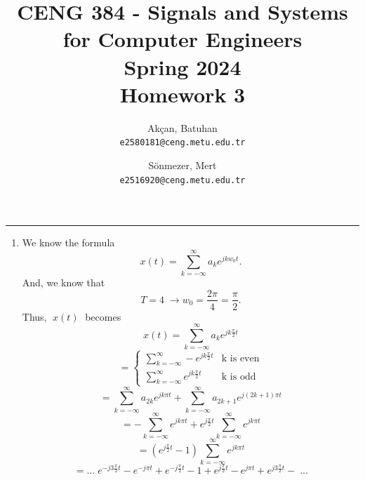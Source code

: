\documentclass[10pt,a4paper, margin=1in]{article}
\author{
  Akçan, Batuhan\\
  \texttt{e2580181@ceng.metu.edu.tr}
  \and
  Sönmezer, Mert\\
  \texttt{e2516920@ceng.metu.edu.tr}
}
\title{CENG 384 - Signals and Systems for Computer Engineers \\
Spring 2024 \\
Homework 3}
\begin{document}
\maketitle



\noindent\rule{19cm}{1.2pt}

\begin{enumerate}

\item %
We know the formula
$$x(t) = \sum_{k=-\infty}^{\infty} a_k e^{jkw_0t}.$$
And, we know that
$$T=4 \; \rightarrow w_0 = \frac{2\pi}{4} = \frac{\pi}{2}.$$
Thus, $\; x(t) \;$ becomes
$$x(t) = \sum_{k=-\infty}^{\infty} a_k e^{jk\frac{\pi}{2}t}$$
$$=
\begin{cases}
    \sum_{k=-\infty}^{\infty}-e^{jk\frac{\pi}{2}t} & \text{k is even}\\
    \sum_{k=-\infty}^{\infty}e^{jk\frac{\pi}{2}t} & \text{k is odd}
\end{cases}
$$
$$=\sum_{k=-\infty}^{\infty}a_{2k}e^{jk\pi t}+\sum_{k=-\infty}^{\infty}a_{2k+1}e^{j(2k+1)\pi t}$$
$$=-\sum_{k=-\infty}^{\infty}e^{jk\pi t}+e^{j\frac{\pi}{2} t}\sum_{k=-\infty}^{\infty}e^{jk\pi t}$$
$$=(e^{j\frac{\pi}{2}t} - 1)\sum_{k=-\infty}^{\infty}e^{jk\pi t}$$
$$= ... \; e^{-j3\frac{\pi}{2} t} - e^{-j\pi t}+e^{-j\frac{\pi}{2}t}-1+e^{j\frac{\pi}{2}t}-e^{j\pi t} + e^{j3\frac{\pi}{2}t} - \; ...$$


\end{enumerate}
\end{document}

